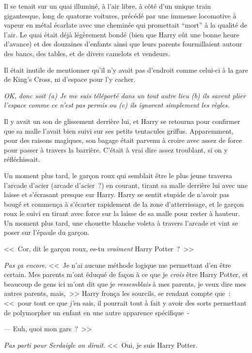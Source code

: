 Il se tenait sur un quai illuminé, à l'air libre, à côté d'un unique train gigantesque, long de quatorze voitures, précédé par une immense locomotive à vapeur en métal écarlate avec une cheminée qui promettait “mort” à la qualité de l'air. Le quai était déjà légèrement bondé (bien que Harry eût une bonne heure d'avance) et des douzaines d'enfants ainsi que leurs parents fourmillaient autour des bancs, des tables, et de divers camelots et vendeurs.

Il était inutile de mentionner qu'il n'y avait pas d'endroit comme celui-ci à la gare de King's Cross, ni d'espace pour l'y cacher.

\emph{OK, donc soit (a) Je me suis téléporté dans un tout autre lieu (b) ils savent plier l'espace comme ce n'est pas permis ou (c) ils ignorent simplement les règles.}

Il y avait un son de glissement derrière lui, et Harry se retourna pour confirmer que sa malle l'avait bien suivi sur ses petits tentacules griffus. Apparemment, pour des raisons magiques, son bagage était parvenu à croire avec assez de force pour passer à travers la barrière. C'était à vrai dire assez troublant, si on y réfléchissait.

Un moment plus tard, le garçon roux qui semblait être le plus jeune traversa l'arcade d'acier (arcade d'acier~?) en courant, tirant sa malle derrière lui avec une laisse et s'écrasant presque sur Harry. Harry se sentit stupide de n'avoir pas bougé et commença à s'écarter rapidement de la zone d'atterrissage, et le garçon roux le suivi en tirant avec force sur la laisse de sa malle pour rester à hauteur. Un moment plus tard, une chouette blanche voleta à travers l'arcade et vint se poser sur l'épaule du garçon.

<<~Cor, dit le garçon roux, es-tu \emph{vraiment} Harry Potter~?~>>

\emph{Pas ça encore}. <<~Je n'ai aucune méthode logique me permettant d'en être certain. Mes parents m'ont éduqué de façon à ce que je \emph{crois} être Harry Potter, et beaucoup de gens ici m'ont dit que je \emph{ressemblais} à mes parents, je veux dire mes autres parents, mais,~>> Harry fronça les sourcils, se rendant compte que~: <<~pour tout ce que \emph{j'}en sais, il pourrait tout à fait y avoir des sorts permettant de polymorpher un enfant en une autre apparence spécifique~-

--- Euh, quoi mon gars~?~>>

\emph{Pas parti pour Serdaigle on dirait}. <<~Oui, je suis Harry Potter.

